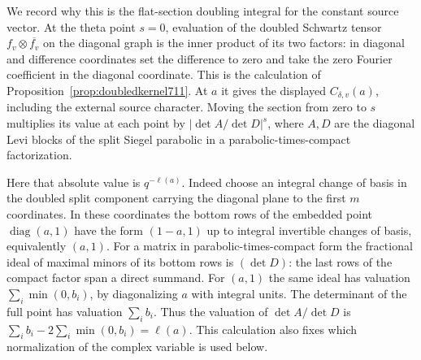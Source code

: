 \documentclass[a4paper,11pt]{article}
\theoremstyle{definition}
\theoremstyle{remark}
\numberwithin{equation}{section}
\begin{document}
We record why this is the flat-section doubling integral for
the constant source vector. At the theta point \(s=0\),
evaluation of the doubled Schwartz tensor
\(f_v\otimes\overline{f_v}\) on the diagonal graph is the
inner product of its two factors: in diagonal and difference
coordinates set the difference to zero and take the zero
Fourier coefficient in the diagonal coordinate. This is the
calculation of Proposition~\ref{prop:doubledkernel711}.
At \(a\) it gives the displayed \(C_{\delta,v}(a)\), including
the external source character. Moving the section from zero to
\(s\) multiplies its value at each point by
\(\lvert\det A/\det D\rvert^s\), where \(A,D\) are the
diagonal Levi blocks of the split Siegel parabolic in a
parabolic-times-compact factorization.

Here that absolute value is \(q^{-\ell(a)}\). Indeed choose an
integral change of basis in the doubled split component carrying
the diagonal plane to the first \(m\) coordinates. In these
coordinates the bottom rows of the embedded point
\(\operatorname{diag}(a,1)\) have the form \((1-a,1)\) up to
integral invertible changes of basis, equivalently \((a,1)\).
For a matrix in parabolic-times-compact form the fractional
ideal of maximal minors of its bottom rows is \((\det D)\):
the last rows of the compact factor span a direct summand.
For \((a,1)\) the same ideal has valuation
\(\sum_i\min(0,b_i)\), by diagonalizing \(a\) with integral
units. The determinant of the full point has valuation
\(\sum_i b_i\). Thus the valuation of \(\det A/\det D\) is
\(\sum_i b_i-2\sum_i\min(0,b_i)=\ell(a)\).
This calculation also fixes which normalization of the
complex variable is used below.
\end{document}

